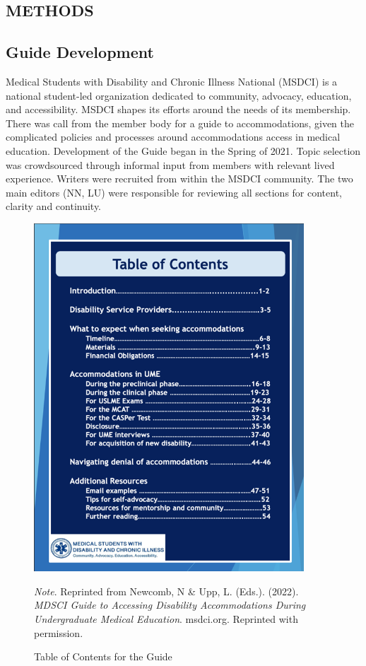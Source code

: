 \documentclass[11.5pt]{sig-alternate} %
\begin{document}
\begin{large}
\section*{METHODS}
\subsection*{Guide Development}
Medical Students with Disability and Chronic Illness National (MSDCI) is a national student-led organization dedicated to community, advocacy, education, and accessibility. MSDCI shapes its efforts around the needs of its membership. There was call from the member body for a guide to accommodations, given the complicated policies and processes around accommodations access in medical education. Development of the Guide began in the Spring of 2021. Topic selection was crowdsourced through informal input from members with relevant lived experience.  Writers were recruited from within the MSDCI community. The two main editors (NN, LU) were responsible for reviewing all sections for content, clarity and continuity. 

\begin{figure}[htbp]
    \centering
    \includegraphics[width=0.9\textwidth]{images/fig1.png}
    \caption{Table of Contents for the Guide}
    \label{Figure 1}
    \justifying
    \textit{Note}. Reprinted from Newcomb, N  \&  Upp, L. (Eds.). (2022). \textit{MDSCI Guide to Accessing Disability Accommodations During Undergraduate Medical Education}. msdci.org. Reprinted with permission.
\end{figure}


\end{large}
\end{document}
